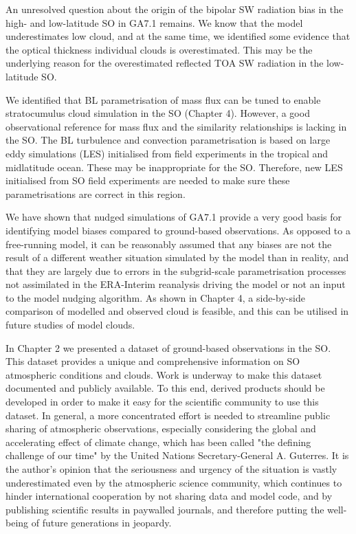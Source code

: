 An unresolved question about the origin of the bipolar SW radiation
bias in the high- and low-latitude SO in GA7.1 remains. We know that
the model underestimates low cloud, and at the same time, we identified
some evidence that the optical thickness individual clouds is overestimated.
This may be the underlying reason for the overestimated reflected TOA SW
radiation in the low-latitude SO.

We identified that BL parametrisation of mass flux can be tuned
to enable stratocumulus cloud simulation in the SO (Chapter 4). However,
a good observational reference for mass flux and the similarity relationships
is lacking in the SO. The BL turbulence and convection
parametrisation is based on large eddy simulations (LES) initialised
from field experiments in the tropical and midlatitude ocean. These may be
inappropriate for the SO. Therefore, new LES initialised from SO field
experiments are needed to make sure these parametrisations are correct in this
region.

We have shown that nudged simulations of GA7.1 provide a very good basis
for identifying model biases compared to ground-based observations. As opposed
to a free-running model, it can be reasonably assumed that any biases are
not the result of a different weather situation simulated by the model
than in reality, and that they are largely due to errors in the subgrid-scale
parametrisation processes not assimilated in the ERA-Interim reanalysis driving
the model or not an input to the model nudging algorithm. As shown in Chapter 4,
a side-by-side comparison of modelled and observed cloud is feasible, and this
can be utilised in future studies of model clouds.

In Chapter 2 we presented a dataset of ground-based observations in the SO.
This dataset provides a unique and comprehensive information on SO atmospheric
conditions and clouds. Work is underway to make this dataset documented and
publicly available. To this end, derived products should be developed in order
to make it easy for the scientific community to use this dataset. In general,
a more concentrated effort is needed to streamline public sharing of atmospheric
observations, especially considering the global and accelerating
effect of climate change, which has been called
"the defining challenge of our time" \citep{wmo2019} by the United Nations
Secretary-General A. Guterres. It is the author's opinion that the
seriousness and urgency of the situation is vastly underestimated even
by the atmospheric science community, which continues to hinder international
cooperation by not sharing data and model code, and by publishing scientific
results in paywalled journals, and therefore putting the well-being of future
generations in jeopardy.

